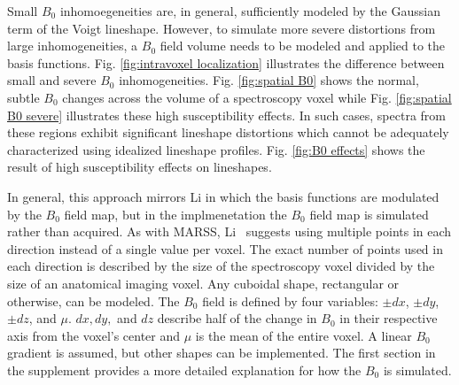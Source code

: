 % 

Small $B_0$ inhomoegeneities are, in general, sufficiently modeled by the Gaussian term of the Voigt lineshape. However, to simulate more severe distortions from large inhomogeneities, a $B_0$ field volume needs to be modeled and applied to the basis functions. Fig. \ref{fig:intravoxel localization} illustrates the difference between small and severe $B_0$ inhomogeneities. Fig. \ref{fig:spatial B0} shows the normal, subtle $B_0$ changes across the volume of a spectroscopy voxel while Fig. \ref{fig:spatial B0 severe} illustrates these high susceptibility effects. In such cases, spectra from these regions exhibit significant lineshape distortions which cannot be adequately characterized using idealized lineshape profiles. Fig. \ref{fig:B0 effects} shows the result of high susceptibility effects on lineshapes.



In general, this approach mirrors Li \etal\cite{Li2015} in which the basis functions are modulated by the $B_0$ field map, but in the implmenetation the $B_0$ field map is simulated rather than acquired. As with MARSS, Li \etal\ suggests using multiple points in each direction instead of a single value per voxel. The exact number of points used in each direction is described by the size of the spectroscopy voxel divided by the size of an anatomical imaging voxel. %
Any cuboidal shape, rectangular or otherwise, can be modeled. The $B_0$ field is defined by four variables: $\pm dx$, $\pm dy$, $\pm dz$, and $\mu$. $dx, dy,$ and $dz$ describe half of the change in $B_0$ in their respective axis from the voxel's center and $\mu$ is the mean of the entire voxel. A linear $B_0$ gradient is assumed, but other shapes can be implemented. The first section in the supplement provides a more detailed explanation for how the $B_0$ is simulated.


